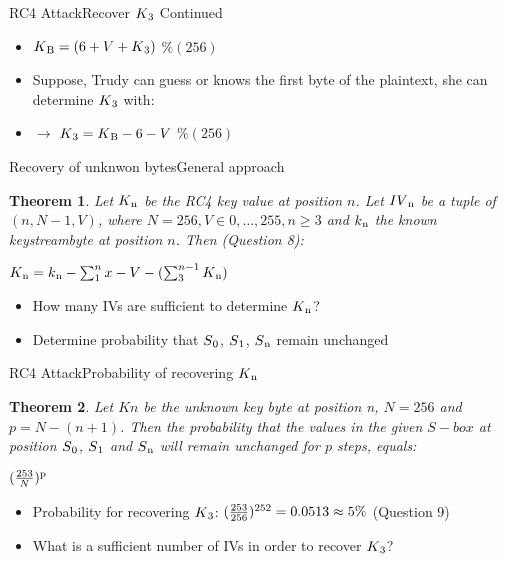 \documentclass[
	aspectratio=169,	%
	onlytextwidth,		%
	t,					%
	]{beamer}
\newtheorem{thm}{Theorem}
\begin{document}
\begin{frame}[fragile]{RC4 Attack}{Recover $K\textsubscript{3}$ Continued}

	\begin{itemize}
		\item $K\textsubscript{B} = (6 + V + K\textsubscript{3})$ $\% (256)$
		\item Suppose, Trudy can guess or knows the first byte of the plaintext, she can determine $K\textsubscript{3}$ with:
		\item $\rightarrow$ $K\textsubscript{3}  = K\textsubscript{B} - 6 - V$ $\% (256)$
	\end{itemize}
\end{frame}

\begin{frame}[fragile]{Recovery of unknwon bytes}{General approach} 
	\begin{thm}
		Let $ K\textsubscript{n} $ be the RC4 key value at position $ n $. Let $ IV\textsubscript{n} $ be a tuple of $ (n, N-1, V) $,
		where $ N = 256, V \in {{0,\dots,255}}, n \geq 3 $ and $ k\textsubscript{n} $ the known keystreambyte at position $n$. Then (Question 8): \\
		\begin{center}
			$K\textsubscript{n} = k\textsubscript{n} - \sum_{1}^{n}x - V - (\sum_{3}^{n-1}K\textsubscript{n})$
		\end{center}
	\end{thm} 
	\begin{itemize}
		\item How many IVs are sufficient to determine $ K\textsubscript{n} $?
		\item Determine probability that $ S\textsubscript{0}$, $S\textsubscript{1}$, $S\textsubscript{n} $ remain unchanged
	\end{itemize}
\end{frame}

\begin{frame}[fragile]{RC4 Attack}{Probability of recovering $K\textsubscript{n}$}
	\begin{thm}
		Let $Kn$ be the unknown key byte at position n, $N=256$ and $p = N-(n+1)$. Then the probability that the values in the given $S-box$ at position $S\textsubscript{0}$,
		$S\textsubscript{1}$ and $S\textsubscript{n}$ will remain unchanged for $p$ steps, equals:\\
		\begin{center}
			$(\frac{253}{N})\textsuperscript{p}$
		\end{center}
	\end{thm} 
	\begin{itemize}
		\item Probability for recovering $K\textsubscript{3}$: $(\frac{253}{256})\textsuperscript{252} = 0.0513 \approx 5\%$ (Question 9)
		\item What is a sufficient number of IVs in order to recover $K\textsubscript{3}$?
	\end{itemize}
\end{frame}
\end{document}
